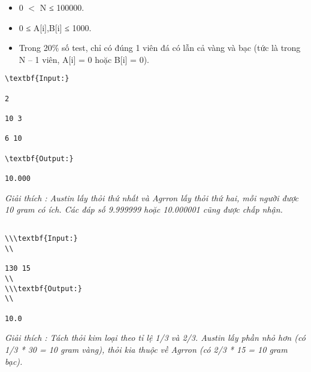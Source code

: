 \begin{itemize}
	\item     0 $<$ N ≤ 100000.   
	\item     0 ≤ A[i],B[i] ≤ 1000.   
	\item     Trong 20\% số test, chỉ có đúng 1 viên đá có lẫn cả vàng và bạc (tức là trong N – 1 viên, A[i] = 0 hoặc B[i] = 0).   
\end{itemize}
\begin{verbatim}
\textbf{Input:}

2

10 3

6 10

\textbf{Output:}

10.000\end{verbatim}

\emph{     Giải thích        : Austin lấy thỏi thứ nhất và Agrron lấy thỏi thứ hai, mỗi người được 10 gram có ích. Các đáp số 9.999999 hoặc 10.000001 cũng được chấp nhận.   }
\begin{verbatim}

\\\textbf{Input:}
\\

130 15
\\
\\\textbf{Output:}
\\

10.0\end{verbatim}

\emph{     Giải thích        : Tách thỏi kim loại theo tỉ lệ 1/3 và 2/3. Austin lấy phần nhỏ hơn (có 1/3 * 30 = 10 gram vàng), thỏi kia thuộc về Agrron (có 2/3 * 15 = 10 gram bạc).   }
